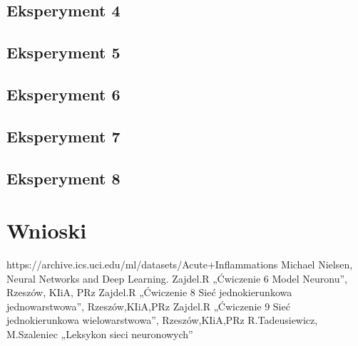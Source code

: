 \documentclass[12pt,twoside]{article}
\begin{document}
\subsection{Eksperyment 4}
\subsection{Eksperyment 5}
\subsection{Eksperyment 6}
\subsection{Eksperyment 7}
\subsection{Eksperyment 8}


\clearpage

\section{Wnioski}

\clearpage


\begin{thebibliography}{4}
 https://archive.ics.uci.edu/ml/datasets/Acute+Inflammations
 Michael Nielsen, Neural Networks and Deep Learning.
 Zajdel.R „Ćwiczenie 6 Model Neuronu”, Rzeszów, KIiA, PRz
 Zajdel.R „Ćwiczenie 8 Sieć jednokierunkowa jednowarstwowa”, Rzeszów,KIiA,PRz
 Zajdel.R „Ćwiczenie 9 Sieć jednokierunkowa wielowarstwowa”, Rzeszów,KIiA,PRz
 R.Tadeusiewicz, M.Szaleniec „Leksykon sieci neuronowych”
\end{thebibliography}

\clearpage
\end{document}
